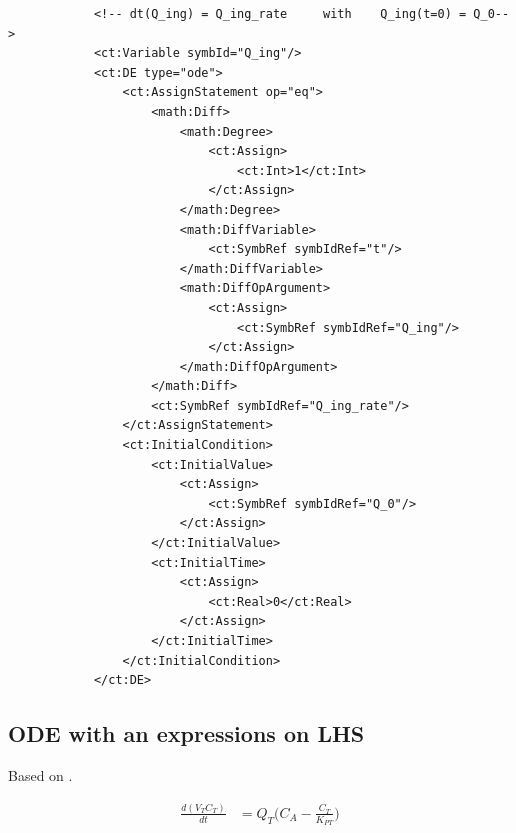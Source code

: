 \lstset{language=XML}
\begin{lstlisting}
            <!-- dt(Q_ing) = Q_ing_rate     with    Q_ing(t=0) = Q_0-->
            <ct:Variable symbId="Q_ing"/>
            <ct:DE type="ode">
                <ct:AssignStatement op="eq">
                    <math:Diff>
                        <math:Degree>
                            <ct:Assign>
                                <ct:Int>1</ct:Int>
                            </ct:Assign>
                        </math:Degree>
                        <math:DiffVariable>
                            <ct:SymbRef symbIdRef="t"/>
                        </math:DiffVariable>
                        <math:DiffOpArgument>
                            <ct:Assign>
                                <ct:SymbRef symbIdRef="Q_ing"/>
                            </ct:Assign>
                        </math:DiffOpArgument>
                    </math:Diff>
                    <ct:SymbRef symbIdRef="Q_ing_rate"/>
                </ct:AssignStatement>
                <ct:InitialCondition>
                    <ct:InitialValue>
                        <ct:Assign>
                            <ct:SymbRef symbIdRef="Q_0"/>
                        </ct:Assign>
                    </ct:InitialValue>
                    <ct:InitialTime>
                        <ct:Assign>
                            <ct:Real>0</ct:Real>
                        </ct:Assign>
                    </ct:InitialTime>
                </ct:InitialCondition>
            </ct:DE>
\end{lstlisting}

\subsection{ODE with an expressions on LHS}

Based on \cite{Mager:2006sf}.

\begin{align}
\frac{d(V_T C_T)}{dt} &= Q_T \Big(C_A - \frac{C_T}{K_{PT}}\Big) \nonumber
\end{align}

